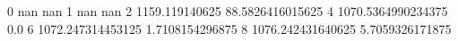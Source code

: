 0 nan nan
1 nan nan
2 1159.119140625 88.5826416015625
4 1070.5364990234375 0.0
6 1072.247314453125 1.7108154296875
8 1076.242431640625 5.7059326171875
